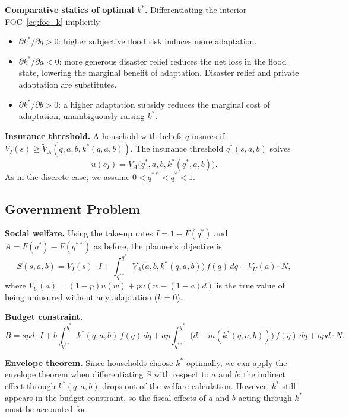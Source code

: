 \documentclass{article}
\begin{document}
\textbf{Comparative statics of optimal $k^*$.} Differentiating the interior FOC~\eqref{eq:foc_k} implicitly:
\begin{itemize}
    \item $\partial k^*/\partial q > 0$: higher subjective flood risk induces more adaptation.
    \item $\partial k^*/\partial a < 0$: more generous disaster relief reduces the net loss in the flood state, lowering the marginal benefit of adaptation. Disaster relief and private adaptation are substitutes.
    \item $\partial k^*/\partial b > 0$: a higher adaptation subsidy reduces the marginal cost of adaptation, unambiguously raising $k^*$.
\end{itemize}

\textbf{Insurance threshold.} A household with beliefs $q$ insures if $V_I(s) \geq \tilde{V}_A(q,a,b,k^*(q,a,b))$. The insurance threshold $q^*(s,a,b)$ solves
\begin{equation}
    u(c_I) = \tilde{V}_A\!\bigl(q^*,a,b,k^*(q^*,a,b)\bigr). \label{eq:qstar_cont}
\end{equation}
As in the discrete case, we assume $0 < q^{**} < q^* < 1$.

\subsection{Government Problem}

\textbf{Social welfare.} Using the take-up rates $I = 1-F(q^*)$ and $A = F(q^*) - F(q^{**})$ as before, the planner's objective is
\begin{equation}
    S(s,a,b) = V_I(s)\cdot I + \int_{q^{**}}^{q^*} V_A\!\bigl(a,b,k^*(q,a,b)\bigr)\,f(q)\,dq + V_U(a)\cdot N, \label{eq:welfare_cont}
\end{equation}
where $V_U(a) = (1-p)u(w) + pu(w-(1-a)d)$ is the true value of being uninsured without any adaptation ($k=0$).

\textbf{Budget constraint.}
\begin{equation}
    B = spd\cdot I
    + b\int_{q^{**}}^{q^*} k^*(q,a,b)\,f(q)\,dq
    + ap\int_{q^{**}}^{q^*} \bigl(d - m(k^*(q,a,b))\bigr)\,f(q)\,dq
    + apd\cdot N. \label{eq:budget_cont}
\end{equation}

\textbf{Envelope theorem.} Since households choose $k^*$ optimally, we can apply the envelope theorem when differentiating $S$ with respect to $a$ and $b$: the indirect effect through $k^*(q,a,b)$ drops out of the welfare calculation. However, $k^*$ still appears in the budget constraint, so the fiscal effects of $a$ and $b$ acting through $k^*$ must be accounted for.
\end{document}
